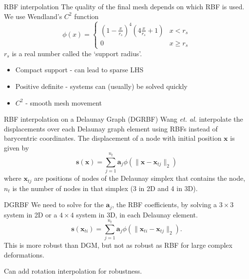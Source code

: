 \documentclass[t,12pt]{beamer}
\let\bld\boldsymbol
\begin{document}
\begin{frame}{RBF interpolation}
The quality of the final mesh depends on which RBF is used. We use Wendland's $C^2$ function 
\begin{equation}
\phi(x) = 
\begin{cases}
\left(1-\frac{x}{r_s}\right)^4\left(4\frac{x}{r_s} + 1\right) & x < r_s \\
0 & x \geq r_s
\end{cases}
\end{equation}
$r_s$ is a real number called the `support radius'.
\begin{itemize}
	\item Compact support - can lead to sparse LHS
	\item Positive definite - systems can (usually) be solved quickly
	\item $C^2$ - smooth mesh movement
\end{itemize}
\end{frame}

\begin{frame}{RBF interpolation on a Delaunay Graph (DGRBF)}
Wang \emph{et. al.}  interpolate the displacements over each Delaunay graph element  using RBFs instead of barycentric coordinates.
The displacement of a node with initial position $\bld{x}$ is given by
\begin{equation}
\mathbf{s}(\mathbf{x}) = \sum_{j=1}^{n_t} \mathbf{a}_j \phi(\lVert\mathbf{x} - \mathbf{x}_{tj}\rVert_2)
\label{eqn:dgrbf}
\end{equation}
where $\bld{x}_{tj}$ are positions of nodes of the Delaunay simplex that contains the node, $n_t$ is the number of nodes in that simplex (3 in 2D and 4 in 3D). 
\end{frame}

\begin{frame}{DGRBF}
We need to solve for the $\bld{a}_j$, the RBF coefficients, by solving a $3 \times 3$ system in 2D or a $4 \times 4$ system in 3D, in each Delaunay element.
\begin{equation}
\mathbf{s}(\mathbf{x}_{ti}) = \sum_{j=1}^{n_t} \mathbf{a}_j \phi(\lVert\mathbf{x}_{ti} - \mathbf{x}_{tj}\rVert_2).
\label{eqn:dgrbfsys}
\end{equation}
This is more robust than DGM, but not as robust as RBF for large complex deformations.

Can add rotation interpolation for robustness.
\end{frame}
\end{document}
